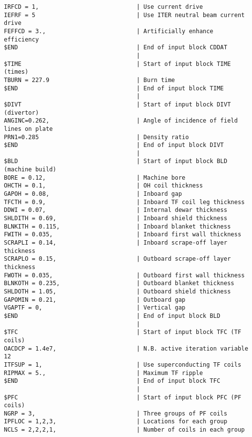 \begin{verbatim}
IRFCD = 1,                            | Use current drive
IEFRF = 5                             | Use ITER neutral beam current drive
FEFFCD = 3.,                          | Artificially enhance efficiency
$END                                  | End of input block CDDAT
                                      | 
$TIME                                 | Start of input block TIME (times)
TBURN = 227.9                         | Burn time
$END                                  | End of input block TIME
                                      | 
$DIVT                                 | Start of input block DIVT (divertor)
ANGINC=0.262,                         | Angle of incidence of field lines on plate
PRN1=0.285                            | Density ratio
$END                                  | End of input block DIVT
                                      | 
$BLD                                  | Start of input block BLD (machine build)
BORE = 0.12,                          | Machine bore
OHCTH = 0.1,                          | OH coil thickness
GAPOH = 0.08,                         | Inboard gap
TFCTH = 0.9,                          | Inboard TF coil leg thickness
DDWI = 0.07,                          | Internal dewar thickness
SHLDITH = 0.69,                       | Inboard shield thickness
BLNKITH = 0.115,                      | Inboard blanket thickness
FWITH = 0.035,                        | Inboard first wall thickness
SCRAPLI = 0.14,                       | Inboard scrape-off layer thickness
SCRAPLO = 0.15,                       | Outboard scrape-off layer thickness
FWOTH = 0.035,                        | Outboard first wall thickness
BLNKOTH = 0.235,                      | Outboard blanket thickness
SHLDOTH = 1.05,                       | Outboard shield thickness
GAPOMIN = 0.21,                       | Outboard gap
VGAPTF = 0,                           | Vertical gap
$END                                  | End of input block BLD
                                      | 
$TFC                                  | Start of input block TFC (TF coils)
OACDCP = 1.4e7,                       | N.B. active iteration variable 12
ITFSUP = 1,                           | Use superconducting TF coils
RIPMAX = 5.,                          | Maximum TF ripple
$END                                  | End of input block TFC
                                      | 
$PFC                                  | Start of input block PFC (PF coils)
NGRP = 3,                             | Three groups of PF coils
IPFLOC = 1,2,3,                       | Locations for each group
NCLS = 2,2,2,1,                       | Number of coils in each group

\end{verbatim}
